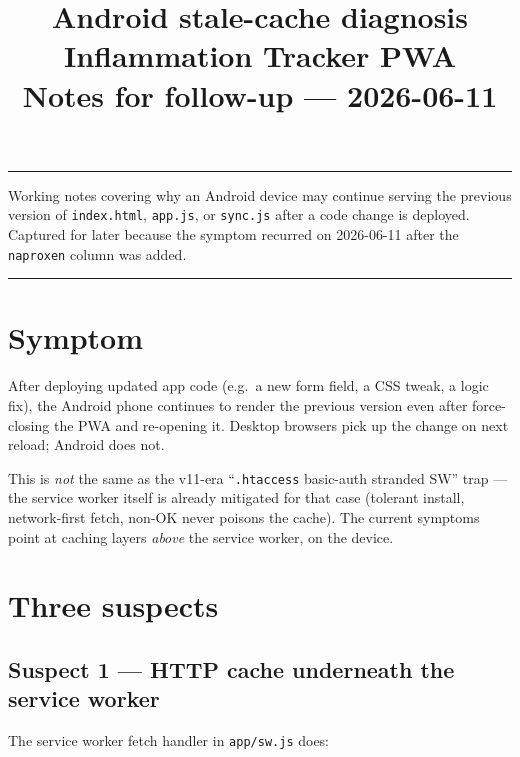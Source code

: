 \documentclass[11pt,a4paper]{article}
\title{\vspace{-1.5cm}\textbf{Android stale-cache diagnosis}\\[4pt]\Large Inflammation Tracker PWA\\[2pt]\normalsize Notes for follow-up --- 2026-06-11}
\author{}
\date{}
\begin{document}
\maketitle
\thispagestyle{fancy}
\vspace{-2em}

{\small\color{gray}\hrule\vspace{4pt}Working notes covering why an Android device may continue serving the previous version of \texttt{index.html}, \texttt{app.js}, or \texttt{sync.js} after a code change is deployed. Captured for later because the symptom recurred on 2026-06-11 after the \texttt{naproxen} column was added.\vspace{4pt}\hrule}

\vspace{1em}

\tableofcontents

\section{Symptom}

After deploying updated app code (e.g.\ a new form field, a CSS tweak, a logic fix), the Android phone continues to render the previous version even after force-closing the PWA and re-opening it. Desktop browsers pick up the change on next reload; Android does not.

This is \emph{not} the same as the v11-era ``\texttt{.htaccess} basic-auth stranded SW'' trap --- the service worker itself is already mitigated for that case (tolerant install, network-first fetch, non-OK never poisons the cache). The current symptoms point at caching layers \emph{above} the service worker, on the device.

\section{Three suspects}

\subsection{Suspect 1 --- HTTP cache underneath the service worker}

The service worker fetch handler in \texttt{app/sw.js} does:
\end{document}
